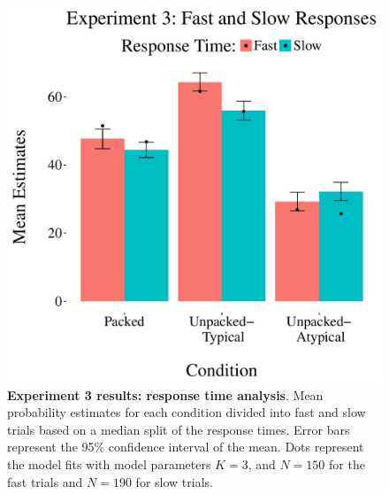 \begin{figure}[ht!]
\centering
\includegraphics[scale=0.4]{figures/mediantimeexp3.pdf}
\caption{\textbf{Experiment 3 results: response time analysis}. Mean probability estimates for each condition divided into fast and slow trials based on a median split of the response times. Error bars represent the 95\% confidence interval of the mean. Dots represent the model fits with model parameters $K = 3$, and $N = 150$ for the fast trials and $N = 190$ for slow trials.}
\label{fig:medsplitexp3}
\end{figure}



